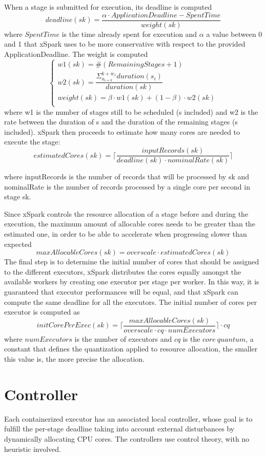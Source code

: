 When a stage is submitted for execution, its deadline is computed
\[deadline(sk) = \dfrac{\alpha\cdot ApplicationDeadline - SpentTime}{weight(sk)}\]
where $SpentTime$ is the time already spent for execution and $\alpha$ a
value between 0 and 1 that xSpark uses to be more conservative with
respect to the provided ApplicationDeadline. The weight is computed
\[\begin{cases}
w1(sk) = \#(RemainingStages + 1)\\
w2(sk) = \dfrac{{\Sigma}_{{a}_{i=k}}^{k+{w}_{1}}duration(s_i)}{duration(sk)}\\
weight(sk) = \beta\cdot w1(sk) + (1 - \beta) \cdot w2(sk)\\
\end{cases}\]
where w1 is the number of stages still to be scheduled (s included)
and w2 is the rate between the duration of s and the duration of the
remaining stages (s included).
xSpark then proceeds to estimate how many cores are needed to execute the stage:
\[estimatedCores(sk) = \lceil {\dfrac {inputRecords(sk)}{deadline(sk) \cdot nominalRate(sk)}}\rceil\]

where inputRecords is the number of records that will be processed by sk and nominalRate is the number of records processed by a single core per second in stage sk.

Since xSpark controls the resource allocation of a stage before and during the execution, the maximum amount of allocable cores needs to be greater than the estimated one, in order to be able to accelerate when progressing slower than expected 
\[maxAllocableCores(sk) = overscale \cdot estimatedCores(sk)\]
The final step is to determine the initial number of cores that should be assigned to the different executors, xSpark distributes the cores equally amongst the available workers by creating one executor per stage per worker. In this way, it is guaranteed that executor performances will be equal, and that xSpark can compute the same deadline for all the executors. The initial number of cores per executor is computed as
\[initCorePerExec(sk) = \lceil\dfrac {maxAllocableCores(sk)}{overscale \cdot cq \cdot numExecutors}\rceil\cdot cq\]
where $numExecutors$ is the number of executors and $cq$ is the $core\  quantum$, a constant that defines the quantization applied to resource
allocation, the smaller this value is, the more precise the allocation.

\section{Controller}\label{subsec:controller}
Each containerized executor has an associated local controller, whose goal is to fulfill the per-stage deadline taking into account external disturbances by dynamically allocating CPU cores. The controllers use control theory, with no heuristic involved.


